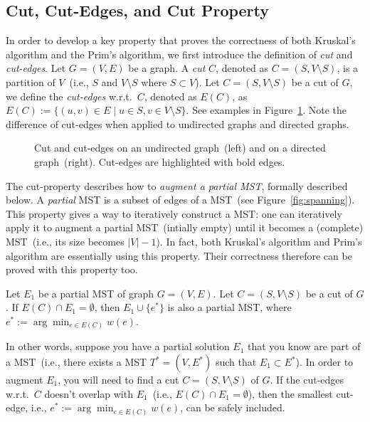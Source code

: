 \subsection*{Cut, Cut-Edges, and Cut Property}

In order to develop a key property that proves the correctness of both Kruskal's algorithm
and the Prim's algorithm, we first introduce the definition of \emph{cut} and \emph{cut-edges}.
Let $G = (V, E)$ be a graph. A \emph{cut} $C$, denoted as $C = (S, V\setminus S)$,
is a partition of $V$~(i.e., $S$ and $V\setminus S$ where $S\subset V$).
Let $C = (S, V\setminus S)$ be a cut of $G$, we define the \emph{cut-edges} w.r.t.\ $C$,
denoted as $E(C)$, as $E(C) := \{(u,v)\in E\mid u\in S, v\in V\setminus S\}$.
See examples in Figure~\ref{fig:cut}.  Note the difference of cut-edges
when applied to undirected graphs and directed graphs.

\begin{figure}[h]
\centering{}
\caption{Cut and cut-edges on an undirected graph~(left) and on a directed graph~(right).
Cut-edges are highlighted with bold edges.}
\label{fig:cut}
\end{figure}

The cut-property describes how to \emph{augment a partial MST}, 
formally described below.
A \emph{partial} MST is a subset of edges of a MST~(see Figure~\ref{fig:spanning}).
This property gives a way to iteratively construct a MST: one can iteratively
apply it to augment a partial MST~(intially empty) until it becomes a (complete) 
MST~(i.e., its size becomes $|V| - 1$).
In fact, both Kruskal's algorithm and Prim's algorithm
are essentially using this property.
Their correctness therefore can be proved with this property too.

\begin{claim}
Let $E_1$ be a partial MST of graph $G = (V, E)$. %
Let $C = (S,V\setminus S)$ be a cut of $G$.
If $E(C) \cap E_1 = \emptyset$, %
then $E_1\cup \{e^*\}$ is also a partial MST, where $e^* := \arg\min_{e\in E(C)} w(e)$.
\end{claim}

In other words, suppose you have a partial solution $E_1$ that you know
are part of a MST~(i.e., there exists a MST $T^* = (V, E^*)$ such that $E_1\subset E^*$). 
In order to augment $E_1$, you will need to find a cut $C = (S, V\setminus S)$ of $G$.
If the cut-edges w.r.t.\ $C$ doesn't overlap with $E_1$~(i.e., $E(C)\cap E_1 = \emptyset$),
then the smallest cut-edge, i.e., $e^* := \arg\min_{e\in E(C)} w(e)$,
can be safely included.

